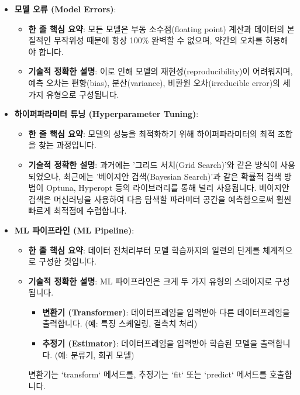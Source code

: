 \documentclass[11pt,a4paper]{article}
\begin{document}
\begin{itemize}
    \item \textbf{모델 오류 (Model Errors)}:
    \begin{itemize}
        \item \textbf{한 줄 핵심 요약}: 모든 모델은 부동 소수점(floating point) 계산과 데이터의 본질적인 무작위성 때문에 항상 100\% 완벽할 수 없으며, 약간의 오차를 허용해야 합니다.
        \item \textbf{기술적 정확한 설명}: 이로 인해 모델의 재현성(reproducibility)이 어려워지며, 예측 오차는 편향(bias), 분산(variance), 비환원 오차(irreducible error)의 세 가지 유형으로 구성됩니다.
    \end{itemize}

    \item \textbf{하이퍼파라미터 튜닝 (Hyperparameter Tuning)}:
    \begin{itemize}
        \item \textbf{한 줄 핵심 요약}: 모델의 성능을 최적화하기 위해 하이퍼파라미터의 최적 조합을 찾는 과정입니다.
        \item \textbf{기술적 정확한 설명}: 과거에는 '그리드 서치(Grid Search)'와 같은 방식이 사용되었으나, 최근에는 '베이지안 검색(Bayesian Search)'과 같은 확률적 검색 방법이 Optuna, Hyperopt 등의 라이브러리를 통해 널리 사용됩니다. 베이지안 검색은 머신러닝을 사용하여 다음 탐색할 파라미터 공간을 예측함으로써 훨씬 빠르게 최적점에 수렴합니다.
    \end{itemize}

    \item \textbf{ML 파이프라인 (ML Pipeline)}:
    \begin{itemize}
        \item \textbf{한 줄 핵심 요약}: 데이터 전처리부터 모델 학습까지의 일련의 단계를 체계적으로 구성한 것입니다.
        \item \textbf{기술적 정확한 설명}: ML 파이프라인은 크게 두 가지 유형의 스테이지로 구성됩니다.
        \begin{itemize}
            \item \textbf{변환기 (Transformer)}: 데이터프레임을 입력받아 다른 데이터프레임을 출력합니다. (예: 특징 스케일링, 결측치 처리)
            \item \textbf{추정기 (Estimator)}: 데이터프레임을 입력받아 학습된 모델을 출력합니다. (예: 분류기, 회귀 모델)
        \end{itemize}
        변환기는 `transform` 메서드를, 추정기는 `fit` 또는 `predict` 메서드를 호출합니다.
    \end{itemize}


\end{itemize}
\end{document}
